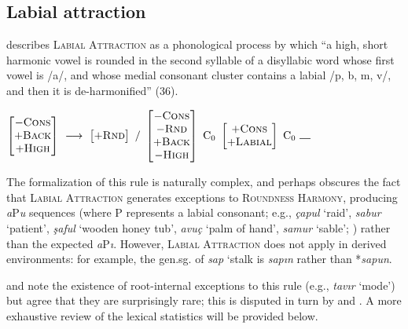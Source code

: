 \subsection{Labial attraction}

\citet{Lees1966b} describes \textsc{Labial Attraction} as a phonological process by which ``a high, short harmonic vowel is rounded in the second syllable of a disyllabic word whose first vowel is /a/, and whose medial consonant cluster contains a labial /p, b, m, v/, and then it is de-harmonified'' (36).

\begin{example}
$\begin{bmatrix} -\textsc{Cons} \\ +\textsc{Back} \\ +\textsc{High} \end{bmatrix}~\goesto~\begin{bmatrix} +\textsc{Rnd} \end{bmatrix}~/~\begin{bmatrix} -\textsc{Cons} \\ -\textsc{Rnd} \\ +\textsc{Back} \\ -\textsc{High} \end{bmatrix}~\textrm{C}_0~\begin{bmatrix} +\textsc{Cons} \\ +\textsc{Labial} \end{bmatrix}~\textrm{C}_0~\gap{}$
\end{example}

The formalization of this rule is naturally complex, and perhaps obscures the fact that \textsc{Labial Attraction} generates exceptions to \textsc{Roundness Harmony}, producing \emph{a}P\emph{u} sequences (where P represents a labial consonant; e.g., \emph{çapul} `raid', \emph{sabur} `patient', \emph{şaful} `wooden honey tub', \emph{avuç} `palm of hand', \emph{samur} `sable'; \citealp[285]{Lees1966a}) rather than the expected \emph{a}P\emph{ı}. However, \textsc{Labial Attraction} does not apply in derived environments: for example, the gen.sg. of \emph{sap} `stalk is \emph{sapın} rather than *\emph{sapun}.

\citet[286]{Lees1966a} and \citet[311]{Zimmer1969} note the existence of root-internal exceptions to this rule (e.g., \emph{tavır} `mode') but agree that they are surprisingly rare; this is disputed in turn by  \citet{Clements1982} and \citet{Inkelas2001}. A more exhaustive review of the lexical statistics will be provided below.

